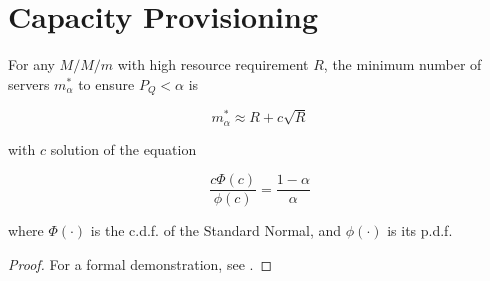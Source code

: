 \section{Capacity Provisioning}
\label{sec:Capacity-Provisioning}

\begin{theorem}
\label{thm:Square-Root-Staffing-Rule}	
	For any $M/M/m$ with high resource requirement $R$, the minimum number of servers $m_{\alpha}^{*}$ to ensure $P_{Q} < \alpha$ is
	
	\begin{equation}
	\label{eqn:Square-Root-Staffing-Rule}
	m_{\alpha}^{*} \approx R + c \sqrt{R}
	\end{equation}
	
	with $c$ solution of the equation
	
	\begin{equation}
	\label{eqn:Square-Root-Staffing-Rule-c}
		\frac{c \Phi(c)}{\phi(c)} = \frac{1 - \alpha}{\alpha}
	\end{equation}	
	
	where
	$\Phi(\cdot)$ is the c.d.f. of the Standard Normal, and
	$\phi(\cdot)$ is its p.d.f.
	
	\begin{proof}
		For a formal demonstration, see \cite{harchol2013performance}.
	\end{proof}
\end{theorem}